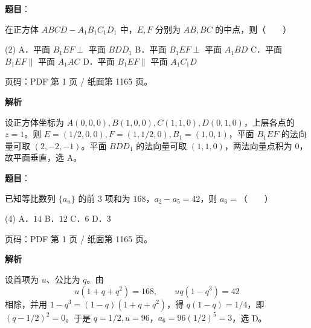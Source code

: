 \begin{answer}

\textbf{题目}：

在正方体 $ABCD-A_1B_1C_1D_1$ 中，$E,F$ 分别为 $AB,BC$ 的中点，则\mbox{（　　）}

\begin{gkopts}(2)
\task A．平面 $B_1EF\perp$ 平面 $BDD_1$
\task B．平面 $B_1EF\perp$ 平面 $A_1BD$
\task C．平面 $B_1EF\parallel$ 平面 $A_1AC$
\task D．平面 $B_1EF\parallel$ 平面 $A_1C_1D$
\end{gkopts}

\begin{gktip}
页码：PDF 第 1 页 / 纸面第 1165 页。
\end{gktip}

\textbf{解析}

设正方体坐标为 $A(0,0,0),B(1,0,0),C(1,1,0),D(0,1,0)$，上层各点的 $z=1$。则 $E=(1/2,0,0),F=(1,1/2,0),B_1=(1,0,1)$，平面 $B_1EF$ 的法向量可取 $(2,-2,-1)$。平面 $BDD_1$ 的法向量可取 $(1,1,0)$，两法向量点积为 $0$，故平面垂直，选 A。


\end{answer}
\begin{answer}

\textbf{题目}：

已知等比数列 $\{a_n\}$ 的前 3 项和为 $168$，$a_2-a_5=42$，则 $a_6=$\mbox{（　　）}

\begin{gkopts}(4)
\task A．$14$
\task B．$12$
\task C．$6$
\task D．$3$
\end{gkopts}

\begin{gktip}
页码：PDF 第 1 页 / 纸面第 1165 页。
\end{gktip}

\textbf{解析}

设首项为 $u$、公比为 $q$。由
\nopagebreak[4]
\[
u(1+q+q^2)=168,\qquad uq(1-q^3)=42
\]
相除，并用 $1-q^3=(1-q)(1+q+q^2)$，得 $q(1-q)=1/4$，即 $(q-1/2)^2=0$。于是 $q=1/2,u=96$，$a_6=96(1/2)^5=3$，选 D。


\end{answer}

